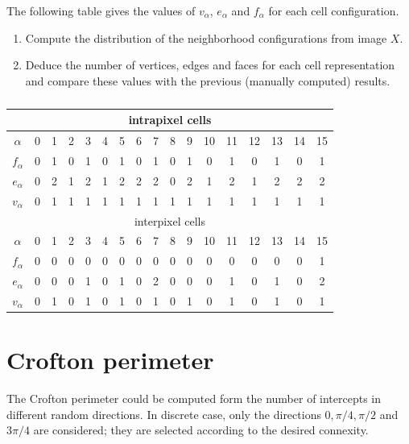 The following table gives the values of $v_{\alpha}$, $e_{\alpha}$ and $f_{\alpha}$ for each cell configuration.

\begin{qbox}
	\begin{enumerate}
		\item Compute the distribution of the neighborhood configurations from image $X$.
		\item Deduce the number of vertices, edges and faces for each cell representation and compare these values with the previous (manually computed) results.
	\end{enumerate}
\end{qbox}

\begin{table}[H]
\centering\caption{}
\begin{tabular}{|c|c|c|c|c|c|c|c|c|c|c|c|c|c|c|c|c|}
\hline
\multicolumn{17}{|c|}{intrapixel cells}\\\hline
$\alpha$&0&1&2&3&4&5&6&7&8&9&10&11&12&13&14&15\\\hline
$f_{\alpha}$&0&1&0&1&0&1&0&1&0&1&0&1&0&1&0&1\\\hline
$e_{\alpha}$&0&2&1&2&1&2&2&2&0&2&1&2&1&2&2&2\\\hline
$v_{\alpha}$&0&1&1&1&1&1&1&1&1&1&1&1&1&1&1&1\\\hline\hline
\multicolumn{17}{|c|}{interpixel cells}\\\hline
$\alpha$&0&1&2&3&4&5&6&7&8&9&10&11&12&13&14&15\\\hline
$f_{\alpha}$&0&0&0&0&0&0&0&0&0&0&0&0&0&0&0&1\\\hline
$e_{\alpha}$&0&0&0&1&0&1&0&2&0&0&0&1&0&1&0&2\\\hline
$v_{\alpha}$&0&1&0&1&0&1&0&1&0&1&0&1&0&1&0&1\\\hline
\end{tabular}
\label{tab:integral_geometry:enonce:contributions}
\end{table}

\vspace*{-10pt}
\section{Crofton perimeter}\vspace*{-5pt}
The Crofton perimeter could be computed form the number of intercepts in different random directions. In discrete case, only the directions $0, \pi/4, \pi/2$ and $3\pi/4$ are considered; they are selected according to the desired connexity.

